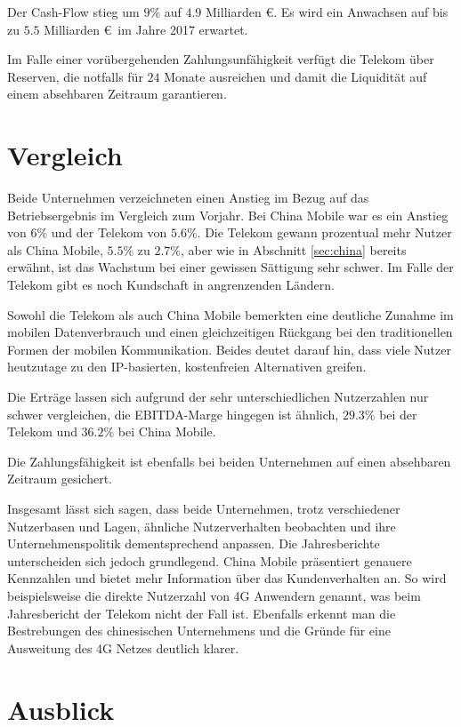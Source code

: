 Der Cash-Flow stieg um $9\%$ auf $4.9$ Milliarden \euro. Es wird ein Anwachsen auf bis zu $5.5$ Milliarden \euro \ im Jahre 2017 erwartet. 

Im Falle einer vorübergehenden Zahlungsunfähigkeit verfügt die Telekom über Reserven, die notfalls für $24$ Monate ausreichen und damit die Liquidität auf einem absehbaren Zeitraum garantieren.    

\section{Vergleich}
\label{sec:vergleich}

Beide Unternehmen verzeichneten einen Anstieg im Bezug auf das Betriebsergebnis im Vergleich zum Vorjahr. Bei China Mobile war es ein Anstieg von $6\%$ und der Telekom von $5.6\%$. Die Telekom gewann prozentual mehr Nutzer als China Mobile, $5.5\%$ zu $2.7\%$, aber wie in Abschnitt \ref{sec:china} bereits erwähnt, ist das Wachstum bei einer gewissen Sättigung sehr schwer. Im Falle der Telekom gibt es noch Kundschaft in angrenzenden Ländern.

Sowohl die Telekom als auch China Mobile bemerkten eine deutliche Zunahme im mobilen Datenverbrauch und einen gleichzeitigen Rückgang bei den traditionellen Formen der mobilen Kommunikation. Beides deutet darauf hin, dass viele Nutzer heutzutage zu den IP-basierten, kostenfreien Alternativen greifen.

Die Erträge lassen sich aufgrund der sehr unterschiedlichen Nutzerzahlen nur schwer vergleichen, die EBITDA-Marge hingegen ist ähnlich, $29.3\%$ bei der Telekom und $36.2\%$ bei China Mobile. 

Die Zahlungsfähigkeit ist ebenfalls bei beiden Unternehmen auf einen absehbaren Zeitraum gesichert.  

Insgesamt lässt sich sagen, dass beide Unternehmen, trotz verschiedener Nutzerbasen und Lagen, ähnliche Nutzerverhalten beobachten und ihre Unternehmenspolitik dementsprechend anpassen. Die Jahresberichte unterscheiden sich jedoch grundlegend. China Mobile präsentiert genauere Kennzahlen und bietet mehr Information über das Kundenverhalten an. So wird beispielsweise die direkte Nutzerzahl von 4G Anwendern genannt, was beim Jahresbericht der Telekom nicht der Fall ist. Ebenfalls erkennt man die Bestrebungen des chinesischen Unternehmens und die Gründe für eine Ausweitung des 4G Netzes deutlich klarer.  

\section{Ausblick}

